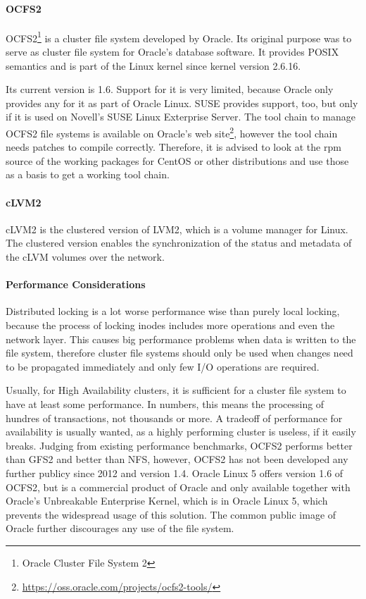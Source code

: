 \paragraph{OCFS2}
OCFS2\footnote{Oracle Cluster File System 2} is a cluster file system developed by Oracle.
Its original purpose was to serve as cluster file system for Oracle's database software.
It provides POSIX semantics and is part of the Linux kernel since kernel version 2.6.16. 

Its current version is 1.6. Support for it is very limited, because Oracle only
provides any for it as part of Oracle Linux. SUSE provides support, too, but only
if it is used on Novell's SUSE Linux Exterprise Server. The tool chain to manage
OCFS2 file systems is available on Oracle's web site\footnote{\url{https://oss.oracle.com/projects/ocfs2-tools/}},
however the tool chain needs patches to compile correctly. Therefore, it is advised
to look at the rpm source of the working packages for CentOS or other distributions and use those as a basis
to get a working tool chain.
\paragraph{cLVM2}
cLVM2 is the clustered version of LVM2, which is a volume manager for Linux.
The clustered version enables the synchronization of the status and metadata
of the cLVM volumes over the network.

\paragraph{Performance Considerations}
Distributed locking is a lot worse performance wise than purely local locking,
because the process of locking inodes includes more operations and even the network layer.
This causes big performance problems when data is written to the file system,
therefore cluster file systems should only be used when changes need to be propagated immediately
and only few I/O operations are required.


Usually, for High Availability clusters, it is sufficient for a cluster file system
to have at least some performance. In numbers, this means the processing of 
hundres of transactions, not thousands or more. A tradeoff of performance for
availability is usually wanted, as a highly performing cluster is useless, if
it easily breaks. Judging from existing performance benchmarks,
\ac{OCFS2} performs better than \ac{GFS2} and better than \ac{NFS}, however,
\ac{OCFS2} has not been developed any further publicy since 2012 and version 1.4.
Oracle Linux 5 offers version 1.6 of \ac{OCFS2}, but is a commercial product
of Oracle and only available together with Oracle's Unbreakable Enterprise
Kernel, which is in Oracle Linux 5, which prevents the widespread usage of this solution.
The common public image of Oracle further discourages any use of the file system.

